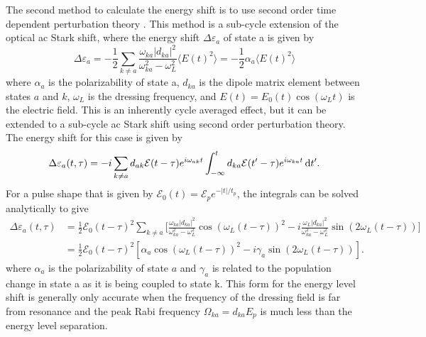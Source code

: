 The second method to calculate the energy shift is to use second order time dependent perturbation theory \cite{chiniSubcycleAcStark2012,chiniCharacterizationApplicationIsolated2012,bransdenPhysicsAtomsMolecules2003, griffithsIntroductionQuantumMechanics2005}.  This method is a sub-cycle extension of the optical ac Stark shift, where the energy shift $\Delta\varepsilon_a$ of state a is given by
\begin{equation}
	\label{eqn:optical_stark}
	\Delta\varepsilon_a=-\frac{1}{2}\sum_{k\neq a}\frac{\omega_{ka}\rvert d_{ka} \lvert^2}{\omega_{ka}^2 - \omega_L^2}\langle E(t)^2 \rangle =-\frac{1}{2}\alpha_a \langle E(t)^2 \rangle
\end{equation}
where $\alpha_a$ is the polarizability of state a, $d_{ka}$ is the dipole matrix element between states $a$ and $k$, $\omega_L$ is the dressing frequency, and $E(t)=E_0(t)\cos(\omega_L t)$ is the electric field.  This is an inherently cycle averaged effect, but it can be extended to a sub-cycle ac Stark shift using second order perturbation theory. The energy shift for this case is given by
\begin{equation}
	\label{eqn:SOPT}
	\Delta \varepsilon_a(t,\tau)=-i\sum_{k\neq a}d_{ak}\mathcal{E}(t-\tau)e^{i\omega_{ak}t}\int_{-\infty}^{t} d_{ka}\mathcal{E}(t'-\tau)e^{i\omega_{ka}t}\mathop{}\!\mathrm{d} t'.
\end{equation}
For a pulse shape that is given by $\mathcal{E}_0(t)=\mathcal{E}_pe^{-\rvert t \lvert/t_p}$, the integrals can be solved analytically to give
\begin{equation}
	\label{eqn:SOPT_integrated}
	\begin{aligned}
	\Delta\varepsilon_a(t,\tau) &=\frac{1}{2}\mathcal{E}_0(t-\tau)^2\sum_{k\neq a}\bigg[ \frac{\omega_{ka}\rvert d_{ka} \lvert^2}{\omega_{ka}^2 - \omega_L^2}\cos(\omega_L (t-\tau))^2 -i\frac{\omega_{L}\rvert d_{ka} \lvert^2}{\omega_{ka}^2 - \omega_L^2}\sin(2\omega_{L} (t-\tau))\bigg]\\
	&=\frac{1}{2}\mathcal{E}_0(t-\tau)^2[\alpha_a\cos(\omega_{L} (t-\tau))^2 - i\gamma_{a}\sin(2\omega_{L} (t-\tau))].
	\end{aligned}
\end{equation}
where $\alpha_a$ is the polarizability of state $a$ and $\gamma_{a}$ is related to the population change in state a as it is being coupled to state k.  This form for the energy level shift is generally only accurate when the frequency of the dressing field is far from resonance and the peak Rabi frequency $\Omega_{ka} = d_{ka}E_p$ is much less than the energy level separation.

